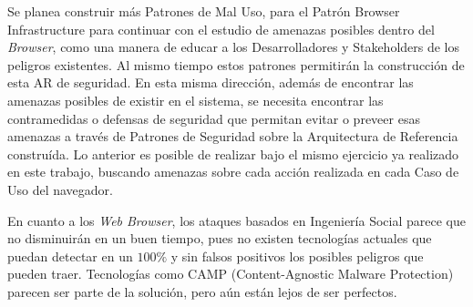 Se planea construir más Patrones de Mal Uso, para el Patrón Browser Infrastructure para continuar con el estudio de amenazas posibles dentro del \textit{Browser}, como una manera de educar a los Desarrolladores y Stakeholders de los peligros existentes. Al mismo tiempo estos patrones permitirán la construcción de esta AR de seguridad. En esta misma dirección, además de encontrar las amenazas posibles de existir en el sistema, se necesita encontrar las contramedidas o defensas de seguridad que permitan evitar o preveer esas amenazas a través de Patrones de Seguridad sobre la Arquitectura de Referencia construída. Lo anterior es posible de realizar bajo el mismo ejercicio ya realizado en este trabajo, buscando amenazas sobre cada acción realizada en cada Caso de Uso del navegador.

En cuanto a los \textit{Web Browser}, los ataques basados en Ingeniería Social parece que no disminuirán en un buen tiempo, pues no existen tecnologías actuales que puedan detectar en un \(100\%\) y sin falsos positivos los posibles peligros que pueden traer. Tecnologías como CAMP (Content-Agnostic Malware Protection) parecen ser parte de la solución, pero aún están lejos de ser perfectos.
